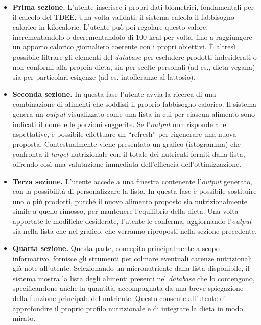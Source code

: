 \documentclass[11pt,a4paper]{article}
\begin{document}
\begin{itemize}
  \item \textbf{Prima sezione.} L’utente inserisce i propri dati biometrici, fondamentali per il calcolo del TDEE. Una volta validati, il sistema calcola il fabbisogno calorico in kilocalorie. L’utente può poi regolare questo valore, incrementandolo o decrementandolo di 100 kcal per volta, fino a raggiungere un apporto calorico giornaliero coerente con i propri obiettivi. È altresì possibile filtrare gli elementi del \textit{database} per escludere prodotti indesiderati o non conformi alla propria dieta, sia per scelte personali (ad es., dieta vegana) sia per particolari esigenze (ad es. intolleranze al lattosio).
  \item \textbf{Seconda sezione.} In questa fase l’utente avvia la ricerca di una combinazione di alimenti che soddisfi il proprio fabbisogno calorico. Il sistema genera un \textit{output} visualizzato come una lista in cui per ciascun alimento sono indicati il nome e le porzioni suggerite. Se l’\textit{output} non risponde alle aspettative, è possibile effettuare un ``refresh'' per rigenerare una nuova proposta. Contestualmente viene presentato un grafico (istogramma) che confronta il \textit{target} nutrizionale con il totale dei nutrienti forniti dalla lista, offrendo così una valutazione immediata dell’efficacia dell’ottimizzazione.
  \item \textbf{Terza sezione.} L’utente accede a una finestra contenente l’\textit{output} generato, con la possibilità di personalizzare la lista. In questa fase è possibile sostituire uno o più prodotti, purché il nuovo alimento proposto sia nutrizionalmente simile a quello rimosso, per mantenere l’equilibrio della dieta. Una volta apportate le modifiche desiderate, l’utente le conferma, aggiornando l’\textit{output} sia nella lista che nel grafico, che verranno riproposti nella sezione precedente.
  \item \textbf{Quarta sezione.} Questa parte, concepita principalmente a scopo informativo, fornisce gli strumenti per colmare eventuali carenze nutrizionali già note all’utente. Selezionando un micronutriente dalla lista disponibile, il sistema mostra la lista degli alimenti presenti nel \textit{database} che lo contengono, specificandone anche la quantità, accompagnata da una breve spiegazione della funzione principale del nutriente. Questo consente all’utente di approfondire il proprio profilo nutrizionale e di integrare la dieta in modo mirato.
\end{itemize}
\end{document}
